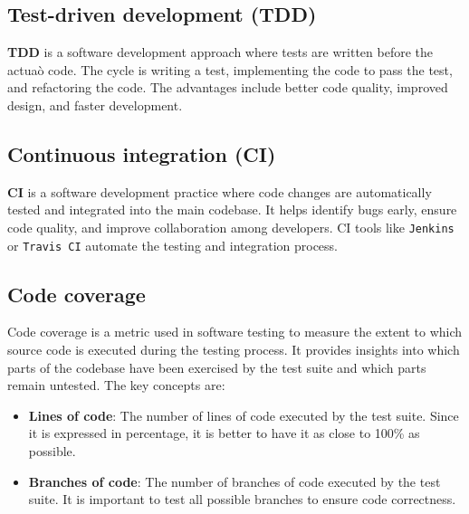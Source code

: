 \subsection*{Test-driven development (TDD)}

\textbf{TDD} is a software development approach where tests are written before the actuaò code. The cycle is writing a test, implementing the code to pass the test, and refactoring the code. The advantages include better code quality, improved design, and faster development.

\subsection*{Continuous integration (CI)}

\textbf{CI} is a software development practice where code changes are automatically tested and integrated into the main codebase. It helps identify bugs early, ensure code quality, and improve collaboration among developers. CI tools like \texttt{Jenkins} or \texttt{Travis CI} automate the testing and integration process.

\subsection*{Code coverage}

Code coverage is a metric used in software testing to measure the extent to which source code is executed during the testing process. It provides insights into which parts of the codebase have been exercised by the test suite and which parts remain untested. The key concepts are:
\begin{itemize}
    \item \textbf{Lines of code}: The number of lines of code executed by the test suite. Since it is expressed in percentage, it is better to have it as close to 100\% as possible.
    \item \textbf{Branches of code}: The number of branches of code executed by the test suite. It is important to test all possible branches to ensure code correctness.
\end{itemize}



